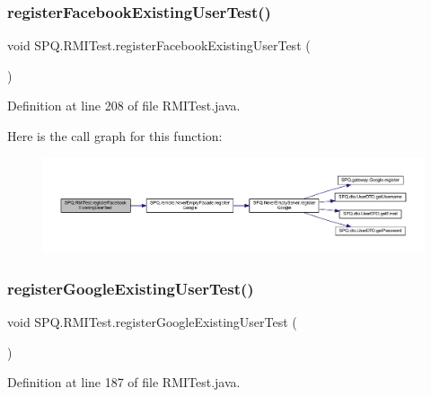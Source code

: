 \subsubsection{\texorpdfstring{register\+Facebook\+Existing\+User\+Test()}{registerFacebookExistingUserTest()}}
{\footnotesize\ttfamily void S\+P\+Q.\+R\+M\+I\+Test.\+register\+Facebook\+Existing\+User\+Test (\begin{DoxyParamCaption}{ }\end{DoxyParamCaption})}



Definition at line 208 of file R\+M\+I\+Test.\+java.

Here is the call graph for this function\+:\nopagebreak
\begin{figure}[H]
\begin{center}
\leavevmode
\includegraphics[width=350pt]{class_s_p_q_1_1_r_m_i_test_aebfcce491b9fa13cafa971bac73f88b8_cgraph}
\end{center}
\end{figure}
\mbox{\label{class_s_p_q_1_1_r_m_i_test_ad375aaea37b3b8f68c670f4c09834a7b}} 
\subsubsection{\texorpdfstring{register\+Google\+Existing\+User\+Test()}{registerGoogleExistingUserTest()}}
{\footnotesize\ttfamily void S\+P\+Q.\+R\+M\+I\+Test.\+register\+Google\+Existing\+User\+Test (\begin{DoxyParamCaption}{ }\end{DoxyParamCaption})}



Definition at line 187 of file R\+M\+I\+Test.\+java.

